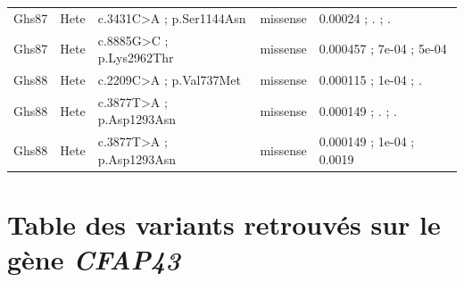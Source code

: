 \documentclass[12pt,twoside]{reedthesis}
\theoremstyle{definition}
\theoremstyle{definition}
\theoremstyle{remark}
\begin{document}
\begin{landscape}
\begin{longtable}[t]{lllll}
  Ghs87 & Hete & c.3431C>A ; p.Ser1144Asn & missense & 0.00024 ; . ; .\\
  Ghs87 & Hete & c.8885G>C ; p.Lys2962Thr & missense & 0.000457 ; 7e-04 ; 5e-04\\
  Ghs88 & Hete & c.2209C>A ; p.Val737Met & missense & 0.000115 ; 1e-04 ; .\\
  \addlinespace
  Ghs88 & Hete & c.3877T>A ; p.Asp1293Asn & missense & 0.000149 ; . ; .\\
  Ghs88 & Hete & c.3877T>A ; p.Asp1293Asn & missense & 0.000149 ; 1e-04 ; 0.0019\\
  \bottomrule
  \end{longtable}
  \end{landscape}
  
  \newpage
  
  \chapter{\texorpdfstring{Table des variants retrouvés sur le gène
  \emph{CFAP43}}{Table des variants retrouvés sur le gène CFAP43}}\label{table-des-variants-retrouves-sur-le-gene-cfap43}
  
\end{document}
